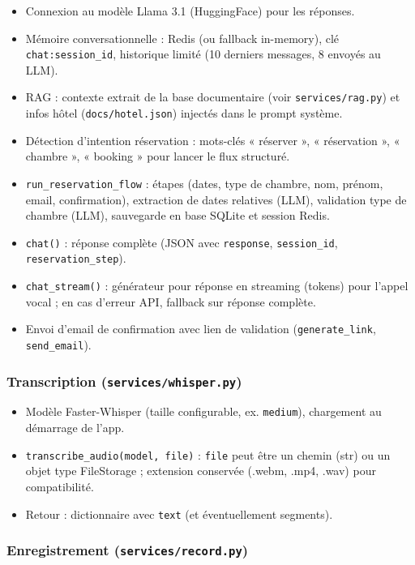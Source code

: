 \documentclass[12pt,a4paper]{article}
\begin{document}
\begin{itemize}[noitemsep]
  \item Connexion au modèle Llama 3.1 (HuggingFace) pour les réponses.
  \item Mémoire conversationnelle : Redis (ou fallback in-memory), clé \texttt{chat:session\_id}, historique limité (10 derniers messages, 8 envoyés au LLM).
  \item RAG : contexte extrait de la base documentaire (voir \texttt{services/rag.py}) et infos hôtel (\texttt{docs/hotel.json}) injectés dans le prompt système.
  \item Détection d'intention réservation : mots-clés « réserver », « réservation », « chambre », « booking » pour lancer le flux structuré.
  \item \texttt{run\_reservation\_flow} : étapes (dates, type de chambre, nom, prénom, email, confirmation), extraction de dates relatives (LLM), validation type de chambre (LLM), sauvegarde en base SQLite et session Redis.
  \item \texttt{chat()} : réponse complète (JSON avec \texttt{response}, \texttt{session\_id}, \texttt{reservation\_step}).
  \item \texttt{chat\_stream()} : générateur pour réponse en streaming (tokens) pour l'appel vocal ; en cas d'erreur API, fallback sur réponse complète.
  \item Envoi d'email de confirmation avec lien de validation (\texttt{generate\_link}, \texttt{send\_email}).
\end{itemize}

\subsubsection{Transcription (\texttt{services/whisper.py})}

\begin{itemize}[noitemsep]
  \item Modèle Faster-Whisper (taille configurable, ex. \texttt{medium}), chargement au démarrage de l'app.
  \item \texttt{transcribe\_audio(model, file)} : \texttt{file} peut être un chemin (str) ou un objet type FileStorage ; extension conservée (.webm, .mp4, .wav) pour compatibilité.
  \item Retour : dictionnaire avec \texttt{text} (et éventuellement segments).
\end{itemize}

\subsubsection{Enregistrement (\texttt{services/record.py})}
\end{document}
